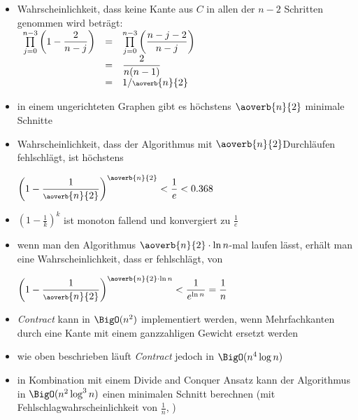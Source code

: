 \begin{itemize}[itemsep=-1pt]
\begin{itemize}
\begin{enumerate}
					\end{enumerate}
				\item Wahrscheinlichkeit, dass keine Kante aus $C$ in allen der $n-2$ Schritten genommen wird beträgt:\\
					$\begin{array}{rcl}
						\prod\limits_{j=0}^{n-3} \left(1-\dfrac{2}{n-j}\right)& = & \prod\limits_{j=0}^{n-3} \left(\dfrac{n-j-2}{n-j}\right)\\
						&=&\dfrac{2}{n(n-1)}\\
						&=&1/\scriptsize{\aoverb{n}{2}}
					\end{array}$
			\end{itemize}
\end{itemize}
\topbreak
\up\up
\begin{itemize}
	\item in einem ungerichteten Graphen gibt es höchstens $\aoverb{n}{2}$ minimale Schnitte
	\item Wahrscheinlichkeit, dass der Algorithmus mit \scriptsize{$\aoverb{n}{2}$}\normalsize Durchläufen fehlschlägt, ist höchstens
		\begin{center}
		$\left(1-\dfrac{1}{\scriptsize{\aoverb{n}{2}}}\right)^{\scriptsize{\aoverb{n}{2}}}<\dfrac{1}{e}<0.368$
		\end{center}
	\item $\left(1-\frac{1}{k}\right)^k$ ist monoton fallend und konvergiert zu $\frac{1}{e}$
	\item wenn man den Algorithmus \scriptsize{$\aoverb{n}{2}\cdot \ln n$}\normalsize-mal laufen lässt, erhält man eine Wahrscheinlichkeit, dass er fehlschlägt, von
		\begin{center}
		$\left(1-\dfrac{1}{\scriptsize{\aoverb{n}{2}}}\right)^{\scriptsize{\aoverb{n}{2}}\cdot \ln n}<\dfrac{1}{e^{\ln n}}=\dfrac{1}{n}$
		\end{center}
	\item \textit{Contract} kann in $\BigO(n^2)$ implementiert werden, wenn Mehrfachkanten durch eine Kante mit einem ganzzahligen Gewicht ersetzt werden
	\item wie oben beschrieben läuft \textit{Contract} jedoch in $\BigO(n^4\log n)$
	\item in Kombination mit einem Divide and Conquer Ansatz kann der Algorithmus in $\BigO(n^2\log^3 n)$ einen minimalen Schnitt berechnen (mit Fehlschlagwahrscheinlichkeit von $\frac{1}{n}$, )\vspace*{-0.5\baselineskip}

\end{itemize}
